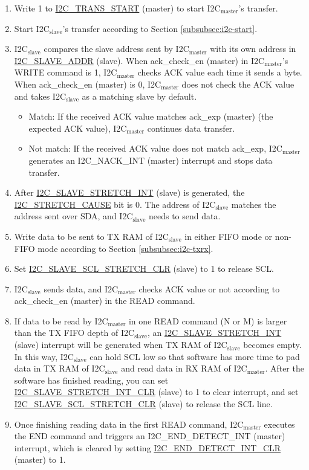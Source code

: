 \documentclass[main\_\_EN.tex]{subfiles}
\begin{document}
\begin{enumerate}
\item Write 1 to \hyperref[fielddesc:I2CTRANSSTART]{I2C\_TRANS\_START} (master) to start I2C$_\text{master}$'s transfer.
\item Start I2C$_\text{slave}$'s transfer according to Section \ref{subsubsec:i2c-start}.
\item I2C$_\text{slave}$ compares the slave address sent by I2C$_\text{master}$ with its own address in \hyperref[fielddesc:I2CSLAVEADDR]{I2C\_SLAVE\_ADDR} (slave). When ack\_check\_en (master) in I2C$_\text{master}$'s WRITE command is 1, I2C$_\text{master}$ checks ACK value each time it sends a byte. When ack\_check\_en (master) is 0, I2C$_\text{master}$ does not check the ACK value and takes I2C$_\text{slave}$ as a matching slave by default.
\begin{itemize}
\item Match: If the received ACK value matches ack\_exp (master) (the expected ACK value), I2C$_\text{master}$ continues data transfer.
\item Not match: If the received ACK value does not match ack\_exp, I2C$_\text{master}$ generates an I2C\_NACK\_INT (master) interrupt and stops data transfer.
\end{itemize}

\item After \hyperref[int:i2c-slave-stretch]{I2C\_SLAVE\_STRETCH\_INT} (slave) is generated, the \hyperref[fielddesc:I2CSTRETCHCAUSE]{I2C\_STRETCH\_CAUSE} bit is 0. The address of I2C$_\text{slave}$ matches the address sent over SDA, and I2C$_\text{slave}$ needs to send data.

\item Write data to be sent to TX RAM of I2C$_\text{slave}$ in either FIFO mode or non-FIFO mode according to Section \ref{subsubsec:i2c-txrx}.
\item Set \hyperref[fielddesc:I2CSLAVESCLSTRETCHCLR]{I2C\_SLAVE\_SCL\_STRETCH\_CLR} (slave) to 1 to release SCL.

\item I2C$_\text{slave}$ sends data, and I2C$_\text{master}$ checks ACK value or not according to ack\_check\_en (master) in the READ command.
\item If data to be read by I2C$_\text{master}$ in one READ command (N or M) is larger than the TX FIFO depth of I2C$_\text{slave}$, an \hyperref[int:i2c-slave-stretch]{I2C\_SLAVE\_STRETCH\_INT} (slave) interrupt will be generated when TX RAM of I2C$_\text{slave}$ becomes empty. In this way, I2C$_\text{slave}$ can hold SCL low so that software has more time to pad data in TX RAM of I2C$_\text{slave}$ and read data in RX RAM of I2C$_\text{master}$. After the software has finished reading, you can set \hyperref[fielddesc:I2CSLAVESTRETCHINTCLR]{I2C\_SLAVE\_STRETCH\_INT\_CLR} (slave) to 1 to clear interrupt, and set \hyperref[fielddesc:I2CSLAVESCLSTRETCHCLR]{I2C\_SLAVE\_SCL\_STRETCH\_CLR} (slave) to release the SCL line.
\item Once finishing reading data in the first READ command, I2C$_\text{master}$ executes the END command and triggers an I2C\_END\_DETECT\_INT (master) interrupt, which is cleared by setting \hyperref[fielddesc:I2CENDDETECTINTCLR]{I2C\_END\_DETECT\_INT\_CLR} (master) to 1.



\end{enumerate}
\end{document}

